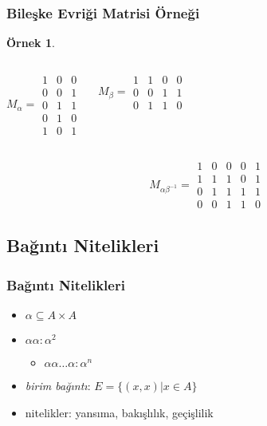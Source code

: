 \documentclass[dvipsnames]{beamer}
\theoremstyle{definition}
\theoremstyle{example}
\newtheorem{ornek}[theorem]{Örnek}
\theoremstyle{plain}
\begin{document}
\begin{frame}
  \frametitle{Bileşke Evriği Matrisi Örneği}

  \begin{ornek}
    \begin{columns}
      \[
        M_\alpha =
          \begin{array}{|ccc|}
            1 & 0 & 0\\
            0 & 0 & 1\\
            0 & 1 & 1\\
            0 & 1 & 0\\
            1 & 0 & 1
          \end{array}
      \]

      \[
        M_\beta =
          \begin{array}{|cccc|}
            1 & 1 & 0 & 0\\
            0 & 0 & 1 & 1\\
            0 & 1 & 1 & 0
          \end{array}
      \]
    \end{columns}

    \[
      M_{\alpha \beta^{-1}} =
        \begin{array}{|ccccc|}
          1 & 0 & 0 & 0 & 1\\
          1 & 1 & 1 & 0 & 1\\
          0 & 1 & 1 & 1 & 1\\
          0 & 0 & 1 & 1 & 0
        \end{array}
    \]
  \end{ornek}
\end{frame}

\subsection{Bağıntı Nitelikleri}

\begin{frame}
  \frametitle{Bağıntı Nitelikleri}

  \begin{itemize}
    \item $\alpha \subseteq A \times A$

    \pause
    \medskip
    \item $\alpha \alpha: \alpha^2$
    \begin{itemize}
      \item $\alpha \alpha \dots \alpha: \alpha^n$
    \end{itemize}

    \pause
    \medskip
    \item \emph{birim bağıntı}: $E = \{(x,x) | x \in A\}$

    \pause
    \medskip
    \item nitelikler: yansıma, bakışlılık, geçişlilik
  \end{itemize}
\end{frame}
\end{document}
